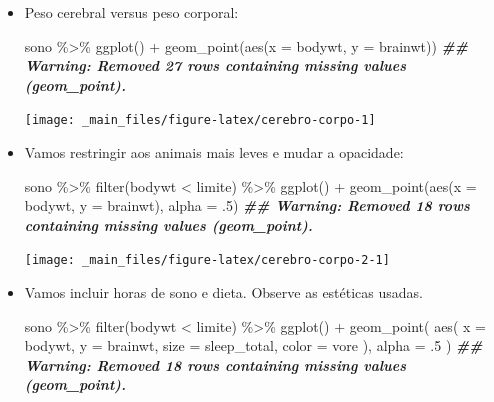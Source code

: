 \documentclass[
  11pt]{report}
\newenvironment{Shaded}{\begin{snugshade}}{\end{snugshade}}
\newcommand{\AttributeTok}[1]{\textcolor[rgb]{0.77,0.63,0.00}{#1}}
\newcommand{\DecValTok}[1]{\textcolor[rgb]{0.00,0.00,0.81}{#1}}
\newcommand{\DocumentationTok}[1]{\textcolor[rgb]{0.56,0.35,0.01}{\textbf{\textit{#1}}}}
\newcommand{\FunctionTok}[1]{\textcolor[rgb]{0.00,0.00,0.00}{#1}}
\newcommand{\NormalTok}[1]{#1}
\newcommand{\SpecialCharTok}[1]{\textcolor[rgb]{0.00,0.00,0.00}{#1}}
\begin{document}
\begin{itemize}
\item
  Peso cerebral versus peso corporal:

\begin{Shaded}
\begin{Highlighting}[]
\NormalTok{sono }\SpecialCharTok{\%\textgreater{}\%} 
  \FunctionTok{ggplot}\NormalTok{() }\SpecialCharTok{+}
    \FunctionTok{geom\_point}\NormalTok{(}\FunctionTok{aes}\NormalTok{(}\AttributeTok{x =}\NormalTok{ bodywt, }\AttributeTok{y =}\NormalTok{ brainwt))}
\DocumentationTok{\#\# Warning: Removed 27 rows containing missing values (geom\_point).}
\end{Highlighting}
\end{Shaded}

  \begin{center}\texttt{[image: \_main\_files/figure-latex/cerebro-corpo-1]} \end{center}
\item
  Vamos restringir aos animais mais leves e mudar a opacidade:

\begin{Shaded}
\begin{Highlighting}[]
\NormalTok{sono }\SpecialCharTok{\%\textgreater{}\%} 
  \FunctionTok{filter}\NormalTok{(bodywt }\SpecialCharTok{\textless{}}\NormalTok{ limite) }\SpecialCharTok{\%\textgreater{}\%} 
  \FunctionTok{ggplot}\NormalTok{() }\SpecialCharTok{+}
    \FunctionTok{geom\_point}\NormalTok{(}\FunctionTok{aes}\NormalTok{(}\AttributeTok{x =}\NormalTok{ bodywt, }\AttributeTok{y =}\NormalTok{ brainwt), }\AttributeTok{alpha =}\NormalTok{ .}\DecValTok{5}\NormalTok{)}
\DocumentationTok{\#\# Warning: Removed 18 rows containing missing values (geom\_point).}
\end{Highlighting}
\end{Shaded}

  \begin{center}\texttt{[image: \_main\_files/figure-latex/cerebro-corpo-2-1]} \end{center}
\item
  Vamos incluir horas de sono e dieta. Observe as estéticas usadas.

\begin{Shaded}
\begin{Highlighting}[]
\NormalTok{sono }\SpecialCharTok{\%\textgreater{}\%} 
  \FunctionTok{filter}\NormalTok{(bodywt }\SpecialCharTok{\textless{}}\NormalTok{ limite) }\SpecialCharTok{\%\textgreater{}\%} 
  \FunctionTok{ggplot}\NormalTok{() }\SpecialCharTok{+}
    \FunctionTok{geom\_point}\NormalTok{(}
      \FunctionTok{aes}\NormalTok{(}
        \AttributeTok{x =}\NormalTok{ bodywt, }
        \AttributeTok{y =}\NormalTok{ brainwt,}
        \AttributeTok{size =}\NormalTok{ sleep\_total,}
        \AttributeTok{color =}\NormalTok{ vore}
\NormalTok{      ), }
      \AttributeTok{alpha =}\NormalTok{ .}\DecValTok{5}
\NormalTok{    )}
\DocumentationTok{\#\# Warning: Removed 18 rows containing missing values (geom\_point).}
\end{Highlighting}
\end{Shaded}


\end{itemize}
\end{document}
